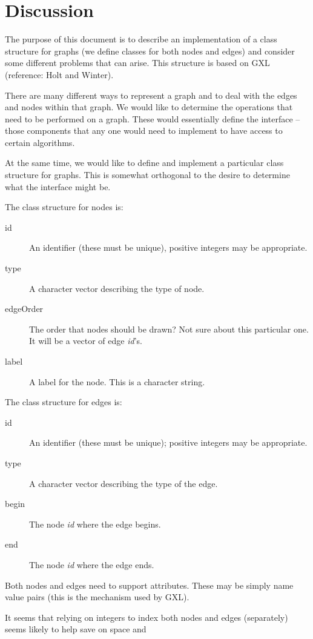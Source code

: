 \section{Discussion}

The purpose of this document is to describe an implementation of a
class structure for graphs (we define classes for both nodes and
edges) and consider some different problems that can arise.
This structure is based on GXL (reference: Holt and Winter).

There are many different ways to represent a graph and to deal with
the edges and nodes within that graph.
We would like to determine the operations that need to be performed on
a graph. These would essentially define the interface -- those
components that any one would need to implement to have access to
certain algorithms.

At the same time, we would like to define and implement a particular
class structure for graphs. This is somewhat orthogonal to the desire
to determine what the interface might be.

The class structure for nodes is:
\begin{description}
\item[id] An identifier (these must be unique), positive integers may
  be appropriate.
\item[type] A character vector describing the type of node.
\item[edgeOrder] The order that nodes should be drawn? Not sure about
  this particular one. It will be a vector of edge {\em id}'s.
\item[label] A label for the node. This is a character string.
\end{description}

The class structure for edges is:
\begin{description}
\item[id] An identifier (these must be unique); positive integers may
  be appropriate.
\item[type] A character vector describing the type of the edge.
\item[begin] The node {\em id} where the edge begins.
\item[end] The node {\em id} where the edge ends.
\end{description}

Both nodes and edges need to support attributes. These may be simply
name value pairs (this is the mechanism used by GXL).

It seems that relying on integers to index both nodes and edges
(separately) seems likely to help save on space and 

